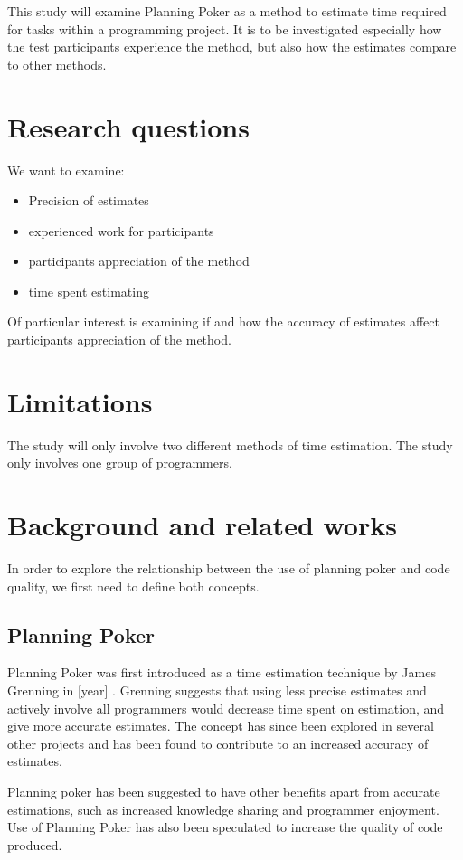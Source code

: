 \documentclass{sigchi}
\begin{document}
This study will examine Planning Poker as a method to estimate time required for tasks within a programming project. It is to be investigated especially how the test participants experience the method, but also how the estimates compare to other methods.

\section{Research questions}
We want to examine:
\begin{itemize}
		\item Precision of estimates
		\item experienced work for participants
		\item participants appreciation of the method
		\item time spent estimating
\end{itemize}
Of particular interest is examining if and how the accuracy of estimates affect participants appreciation of the method.

\section{Limitations}
The study will only involve two different methods of time estimation.
The study only involves one group of programmers.

\section{Background and related works}
In order to explore the relationship between the use of planning poker and code quality, we first need to define both concepts.

\subsection{Planning Poker}
Planning Poker was first introduced as a time estimation technique by James Grenning in [year] \cite{grenning2002planning}.
Grenning suggests that using less precise estimates and actively involve all programmers would
decrease time spent on estimation, and give more accurate estimates. The concept has since been
explored in several other projects and has been found to contribute to an increased accuracy of
estimates\cite{Mahni20122086,1667560}.

Planning poker has been suggested to have other benefits apart from accurate estimations, such as increased knowledge sharing and programmer enjoyment\cite{molokken2008using}. Use of Planning Poker has also been speculated to increase the quality of code produced\cite{molokken2007combining}. 
\end{document}
